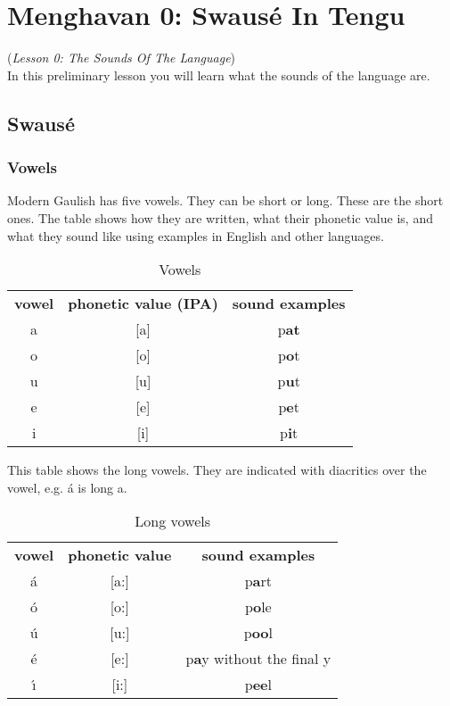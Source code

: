 \section{Menghavan 0: Swaus\'{e} In Tengu}
(\textit{Lesson 0: The Sounds Of The Language})\\

\noindent In this preliminary lesson you will learn what the sounds of the language are.

\subsection{Swaus\'{e}}
\subsubsection{Vowels}
\noindent Modern Gaulish has five vowels. They can be short or long. These are the short ones. The table shows how they are written, what their phonetic value is, and what they sound like using examples in English and other languages.

\begin{table}[H]
\begin{center}
\begin{tabular}{ccc}
  \toprule
  \textbf{vowel} & \textbf{phonetic value (IPA)} & \textbf{sound examples}\\
  \cmidrule(lr){1-1}\cmidrule(lr){2-2}\cmidrule(lr){3-3}
  a & [a] & p\textbf{at}\\
  o & [o] & p\textbf{o}t\\
  u & [u] & p\textbf{u}t\\
  e & [e] & p\textbf{e}t\\
  i & [i] & p\textbf{i}t\\
  \bottomrule
\end{tabular}
\end{center}
\caption{Vowels}
\label{phonology_vowels}
\end{table}

This table shows the long vowels. They are indicated with diacritics over the vowel, e.g. \'{a} is long a.

\begin{table}[H]
\begin{center}
\begin{tabular}{ccc}
  \toprule
  \textbf{vowel} & \textbf{phonetic value} & \textbf{sound examples}\\
  \cmidrule(lr){1-1}\cmidrule(lr){2-2}\cmidrule(lr){3-3}
  \'{a} & [a:] & p\textbf{a}rt\\
  \'{o} & [o:] & p\textbf{o}le\\
  \'{u} & [u:] & p\textbf{oo}l\\
  \'{e} & [e:] & p\textbf{a}y without the final y\\
  \'{\i} & [i:] & p\textbf{ee}l\\
  \bottomrule
\end{tabular}
\end{center}
\caption{Long vowels}
\label{phonology_long_vowels}
\end{table}


